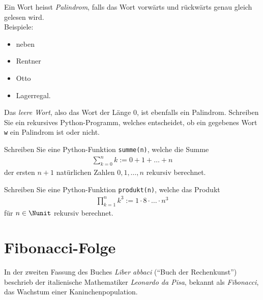\begin{myexercise}\label{myexercise:0377}
Ein Wort heisst \textit{Palindrom}, falls das Wort vorwärts und rückwärts genau gleich gelesen wird.\\
Beispiele:
\begin{itemize}
    \item neben
    \item Rentner
    \item Otto
    \item Lagerregal.
\end{itemize}
Das \textit{leere Wort}, also das Wort der Länge $0$, ist ebenfalls ein Palindrom. Schreiben Sie ein rekursives Python-Programm, welches entscheidet, ob ein gegebenes Wort \lstinline|w| ein Palindrom ist oder nicht.
\end{myexercise}

\begin{myexercise}\label{myexercise:0308}
Schreiben Sie eine Python-Funktion \lstinline|summe(n)|, welche die Summe
\begin{align*}
    \sum_{k=0}^n k := 0 + 1 + \ldots + n
\end{align*}
der ersten $n+1$ natürlichen Zahlen $0,1,\ldots ,n$ rekursiv berechnet.
\end{myexercise}

\begin{myexercise}\label{myexercise:0311}
Schreiben Sie eine Python-Funktion \lstinline|produkt(n)|, welche das Produkt
\begin{align*}
    \prod_{k=1}^n k^3 := 1 \cdot 8 \cdot \ldots \cdot n^3
\end{align*}
für $n\in\Nunit$ rekursiv berechnet.
\end{myexercise}

\clearpage

\section{Fibonacci-Folge}
In der zweiten Fassung des Buches \textit{Liber abbaci} (\enquote{Buch der Rechenkunst}) beschrieb der italienische Mathematiker \textit{Leonardo da Pisa}, bekannt als \textit{Fibonacci}, das Wachstum einer Kaninchenpopulation.


